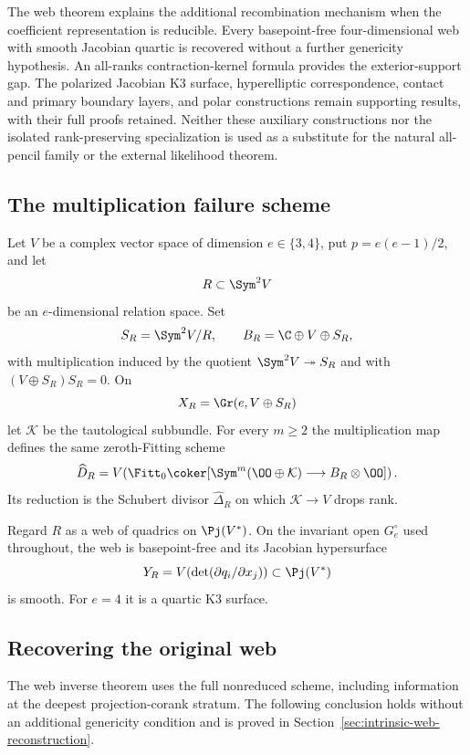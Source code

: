 The web theorem explains the additional recombination mechanism when
the coefficient representation is reducible.  Every basepoint-free
four-dimensional web with smooth Jacobian quartic is recovered without
a further genericity hypothesis.  An all-ranks contraction-kernel
formula provides the exterior-support gap.  The polarized Jacobian
K3 surface, hyperelliptic correspondence, contact and primary boundary
layers, and polar constructions remain supporting results, with their
full proofs retained.  Neither these auxiliary constructions nor the
isolated rank-preserving specialization is used as a substitute for
the natural all-pencil family or the external likelihood theorem.

\subsection{The multiplication failure scheme}

Let \(V\) be a complex vector space of dimension
\(e\in\{3,4\}\), put \(p=e(e-1)/2\), and let
\[
 R\subset\Sym^2V
\]
be an \(e\)-dimensional relation space.  Set
\[
 S_R=\Sym^2V/R,\qquad
 B_R=\C\oplus V\oplus S_R,
\]
with multiplication induced by the quotient
\(\Sym^2V\twoheadrightarrow S_R\) and with
\((V\oplus S_R)S_R=0\).  On
\[
 X_R=\Gr(e,V\oplus S_R)
\]
let \(\mathcal K\) be the tautological subbundle.  For every
\(m\ge2\) the multiplication map defines the same zeroth-Fitting
scheme
\begin{equation}\label{eq:failure-intro}
 \widehat D_R=
 V\!\left(
 \Fitt_0\coker[
 \Sym^m(\OO\oplus\mathcal K)\longrightarrow
 B_R\otimes\OO]\right).
\end{equation}
Its reduction is the Schubert divisor
\(\widehat\Delta_R\) on which \(\mathcal K\to V\) drops rank.

Regard \(R\) as a web of quadrics on \(\Pj(V^*)\).  On the
invariant open \(G_e^\circ\) used throughout, the web is
basepoint-free and its Jacobian hypersurface
\begin{equation}\label{eq:Y-intro}
 Y_R=V\!\left(\det(\partial q_i/\partial x_j)\right)
 \subset\Pj(V^*)
\end{equation}
is smooth.  For \(e=4\) it is a quartic K3 surface.


\subsection{Recovering the original web}

The web inverse theorem uses the full nonreduced scheme,
including information at the deepest projection-corank stratum.  The
following conclusion holds without an additional genericity condition
and is proved in
Section~\ref{sec:intrinsic-web-reconstruction}.

